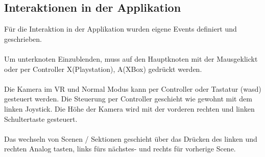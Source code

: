 \subsection{Interaktionen in der Applikation}
Für die Interaktion in der Applikation wurden eigene Events definiert und geschrieben.\\\\
Um unterknoten Einzublenden, muss auf den Hauptknoten mit der Mausgeklickt oder per Controller X(Playstation), A(XBox) gedrückt werden.\\\\
Die Kamera im VR und Normal Modus kann per Controller oder Tastatur (wasd) gesteuert werden. Die Steuerung per Controller geschieht wie gewohnt
mit dem linken Joystick. Die Höhe der Kamera wird mit der vorderen rechten und linken Schultertaste gesteuert.\\\\
Das wechseln von Scenen / Sektionen geschieht über das Drücken des linken und rechten Analog tasten, links fürs nächstes- und rechts für
vorherige Scene.

